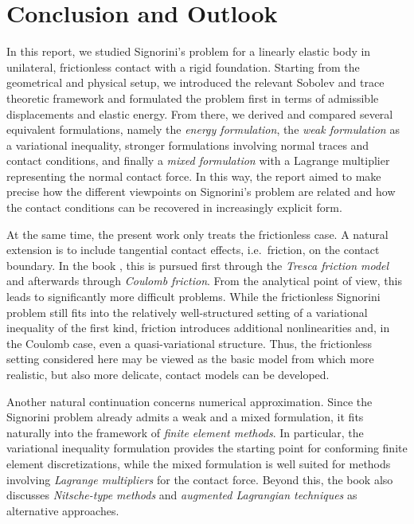 \section{Conclusion and Outlook}

In this report, we studied Signorini's problem for a linearly elastic body in unilateral, frictionless contact with a rigid foundation. Starting from the geometrical and physical setup, we introduced the relevant Sobolev and trace theoretic framework and formulated the problem first in terms of admissible displacements and elastic energy. From there, we derived and compared several equivalent formulations, namely the {\em energy formulation}, the {\em weak formulation} as a variational inequality, stronger formulations involving normal traces and contact conditions, and finally a {\em mixed formulation} with a Lagrange multiplier representing the normal contact force. In this way, the report aimed to make precise how the different viewpoints on Signorini's problem are related and how the contact conditions can be recovered in increasingly explicit form.

At the same time, the present work only treats the frictionless case. A natural extension is to include tangential contact effects, i.e.\ friction, on the contact boundary. In the book \cite{book}, this is pursued first through the {\em Tresca friction model} and afterwards through {\em Coulomb friction}. From the analytical point of view, this leads to significantly more difficult problems. While the frictionless Signorini problem still fits into the relatively well-structured setting of a variational inequality of the first kind, friction introduces additional nonlinearities and, in the Coulomb case, even a quasi-variational structure. Thus, the frictionless setting considered here may be viewed as the basic model from which more realistic, but also more delicate, contact models can be developed.

Another natural continuation concerns numerical approximation. Since the Signorini problem already admits a weak and a mixed formulation, it fits naturally into the framework of {\em finite element methods}. In particular, the variational inequality formulation provides the starting point for conforming finite element discretizations, while the mixed formulation is well suited for methods involving {\em Lagrange multipliers} for the contact force. Beyond this, the book also discusses {\em Nitsche-type methods} and {\em augmented Lagrangian techniques} as alternative approaches.